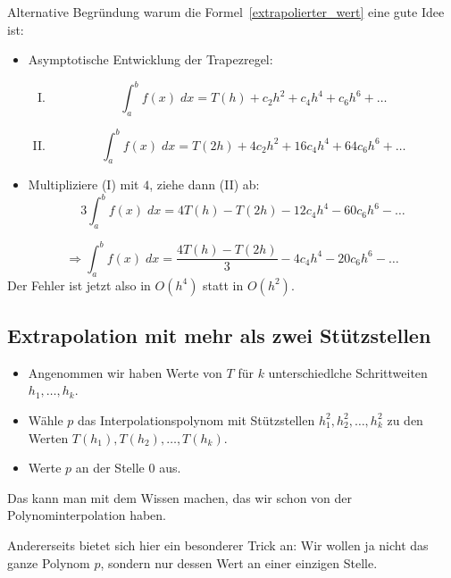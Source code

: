 Alternative Begründung warum die Formel~\eqref{extrapolierter_wert} eine gute Idee ist:
\begin{itemize}
\item Asymptotische Entwicklung der Trapezregel:
\begin{enumerate}[I)]
\item \begin{equation*}
\int_a^b f(x)\;dx = T(h) + c_2 h^2 + c_4 h^4  + c_6 h^6 + \dots
\end{equation*}
\item \begin{equation*}
\int_a^b f(x)\;dx = T(2h) + 4c_2 h^2 + 16c_4 h^4  + 64c_6 h^6 + \dots
\end{equation*}
\end{enumerate}
\item Multipliziere (I) mit $4$, ziehe dann (II) ab:
\begin{equation*}
3\int_a^b f(x)\;dx = 4T(h) - T(2h) - 12c_4 h^4  - 60c_6 h^6 - \dots
\end{equation*}
\end{itemize}
\begin{equation*}
\Rightarrow\int_a^b f(x)\;dx = \frac{4T(h) - T(2h)}{3} - 4c_4 h^4  - 20c_6 h^6 - \dots
\end{equation*}
Der Fehler ist jetzt also in $O(h^4)$ statt in $O(h^2)$.

\subsection{Extrapolation mit mehr als zwei Stützstellen}

\begin{itemize}
\item Angenommen wir haben Werte von $T$ für $k$ unterschiedlche Schrittweiten $h_1, \dots, h_k$.
\item Wähle $p$ das Interpolationspolynom mit Stützstellen $h_1^2, h_2^2, \dots, h_k^2$
   zu den Werten $T(h_1), T(h_2), \dots , T(h_k)$.
\item Werte $p$ an der Stelle $0$ aus.
\end{itemize}

Das kann man mit dem Wissen machen, das wir schon von der Polynominterpolation haben.

\medskip

Andererseits bietet sich hier ein besonderer Trick an: Wir wollen ja nicht das
ganze Polynom $p$, sondern nur dessen Wert an einer einzigen Stelle.


